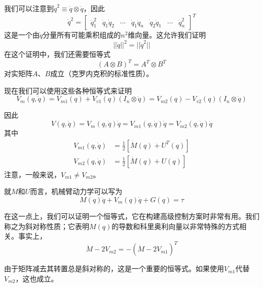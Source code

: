 \documentclass[12pt,a4paper]{ctexart}
\begin{document}
我们可以注意到$\dot{q}^2 \equiv \dot{q} \otimes \dot{q}$，因此
\begin{equation}
\dot{q}^2 = \begin{bmatrix} \dot{q}_1^2 & \dot{q}_1\dot{q}_2 & \cdots & \dot{q}_1\dot{q}_n & \dot{q}_2\dot{q}_1 & \cdots & \dot{q}_n^2 \end{bmatrix}^T
\end{equation}
这是一个由$\dot{q}$分量所有可能乘积组成的$n^2$维向量。这允许我们证明
\begin{equation}
||\dot{q}||^2 = ||\dot{q}^2||
\end{equation}
在这个证明中，我们还需要恒等式
\begin{equation}
(A \otimes B)^T = A^T \otimes B^T
\end{equation}
对实矩阵$A$、$B$成立（克罗内克积的标准性质）。

现在我们可以使用这些各种恒等式来证明
\begin{equation}
V_m(q,\dot{q}) = V_{m1}(q) + V_{v1}(q)(I_n \otimes \dot{q}) = V_{m2}(q) - V_{v2}(q)(I_n \otimes \dot{q})
\end{equation}

因此
\begin{equation}
V(q,\dot{q}) = V_m(q,\dot{q})\dot{q} = V_{m1}(q,\dot{q})\dot{q} = V_{m2}(q,\dot{q})\dot{q}
\end{equation}
其中
\begin{align}
V_{m1}(q,\dot{q}) &= \frac{1}{2}[\dot{M}(q) + U^T(q)] \\
V_{m2}(q,\dot{q}) &= \frac{1}{2}[\dot{M}(q) + U(q)]
\end{align}
注意，一般来说，$V_{m1} \neq V_{m2}$。

就$M$和$U$而言，机械臂动力学可以写为
\begin{equation}
M(q)\ddot{q} + V_m(q)\dot{q} + G(q) = \tau
\end{equation}

在这一点上，我们可以证明一个恒等式，它在构建高级控制方案时非常有用。我们称之为斜对称性质；它表明$M(q)$的导数和科里奥利向量以非常特殊的方式相关。事实上，
\begin{equation}
\dot{M} - 2V_{m2} = -(\dot{M} - 2V_{m1})^T
\end{equation}

由于矩阵减去其转置总是斜对称的，这是一个重要的恒等式。如果使用$V_{m1}$代替$V_{m2}$，这也成立。
\end{document}
